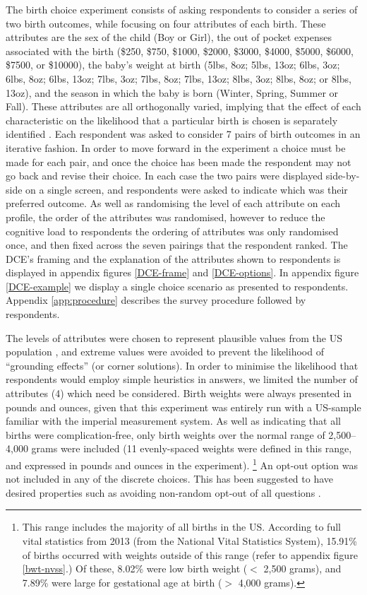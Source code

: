 \documentclass[a4paper, 11pt]{article}
\begin{document}
\begin{spacing}{1.4}
The birth choice experiment consists of asking respondents to consider a series
of two birth outcomes, while focusing on four attributes of each birth.  These
attributes are the sex of the child (Boy or Girl), the out of pocket expenses
associated with the birth (\$250, \$750, \$1000, \$2000, \$3000, \$4000, \$5000,
\$6000, \$7500, or \$10000), the baby's weight at birth (5lbs, 8oz; 5lbs, 13oz;
6lbs, 3oz; 6lbs, 8oz; 6lbs, 13oz; 7lbs, 3oz; 7lbs, 8oz; 7lbs, 13oz; 8lbs, 3oz;
8lbs, 8oz; or 8lbs, 13oz), and the season in which the baby is born (Winter,
Spring, Summer or Fall).  These attributes are all orthogonally varied, implying
that the effect of each characteristic on the likelihood that a particular birth
is chosen is separately identified \citep{Marshalletal2010}. Each respondent 
was asked to consider 7 pairs of birth outcomes in an iterative fashion.  In
order to move forward in the experiment a choice must be made for each pair,
and once the choice has been made the respondent may not go back and revise their
choice.  In each case the two pairs
were displayed side-by-side on a single screen, and respondents were asked to
indicate which was their preferred outcome.  As well as randomising the level
of each attribute on each profile, the order of the attributes was randomised,
however to reduce the cognitive load to respondents the ordering of attributes
was only randomised once, and then fixed across the seven pairings that the
respondent ranked.  The
DCE's framing and the explanation of the attributes shown to respondents is
displayed in appendix figures \ref{DCE-frame} and \ref{DCE-options}.  In
appendix figure \ref{DCE-example} we display a single choice scenario as
presented to respondents.  Appendix \ref{app:procedure} describes the
survey procedure followed by respondents.

The levels of attributes were chosen to represent plausible values from the
US population \citep{RyanFarrar2000}, and extreme values were avoided to
prevent the likelihood of ``grounding effects'' (or corner solutions).  In
order to minimise the likelihood that respondents would employ simple
heuristics in answers, we limited the number of attributes (4) which need be
considered.  Birth weights were always presented in pounds and ounces, given
that this experiment was entirely run with a US-sample familiar with the
imperial measurement system.  As well as indicating
that all births were complication-free, only birth weights over the normal
range of 2,500--4,000 grams were included (11 evenly-spaced weights were
defined in this range, and expressed in pounds and ounces in the experiment).%
\footnote{This range includes the majority of all births in the US.  According
  to full vital statistics from
  2013 (from the National Vital Statistics System), 15.91\% of births occurred
  with weights outside of this range (refer to appendix figure \ref{bwt-nvss}.)
  Of these, 8.02\% were low birth weight ($<$ 2,500 grams), and 7.89\% were
  large for gestational age at birth ($>$ 4,000 grams).
} 
An opt-out option was not included in any of the discrete choices.  This
has been suggested to have desired properties such as avoiding non-random
opt-out of all questions \citep{Veldwijketal2014,BekkerGrobetal2012}.  


\end{spacing}
\end{document}
